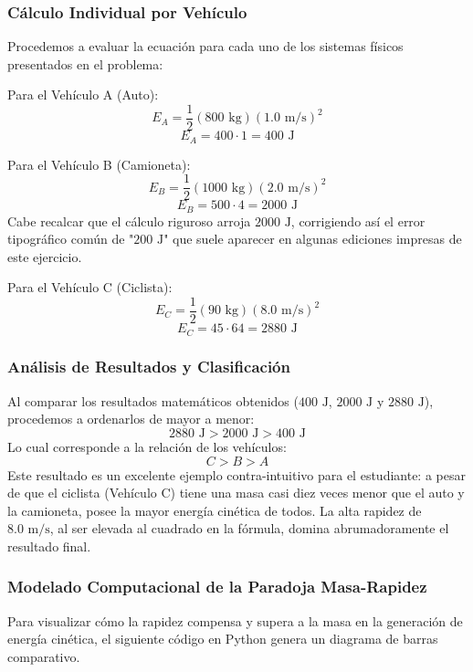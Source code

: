 \documentclass[a4paper,12pt]{article}
\begin{document}
\subsubsection*{Cálculo Individual por Vehículo}
Procedemos a evaluar la ecuación para cada uno de los sistemas físicos presentados en el problema:

Para el Vehículo A (Auto):
$$E_A = \frac{1}{2} (800\text{ kg}) (1.0\text{ m/s})^2$$
$$E_A = 400 \cdot 1 = 400\text{ J}$$

Para el Vehículo B (Camioneta):
$$E_B = \frac{1}{2} (1000\text{ kg}) (2.0\text{ m/s})^2$$
$$E_B = 500 \cdot 4 = 2000\text{ J}$$
Cabe recalcar que el cálculo riguroso arroja $2000\text{ J}$, corrigiendo así el error tipográfico común de "$200\text{ J}$" que suele aparecer en algunas ediciones impresas de este ejercicio.

Para el Vehículo C (Ciclista):
$$E_C = \frac{1}{2} (90\text{ kg}) (8.0\text{ m/s})^2$$
$$E_C = 45 \cdot 64 = 2880\text{ J}$$

\subsubsection*{Análisis de Resultados y Clasificación}
Al comparar los resultados matemáticos obtenidos ($400\text{ J}$, $2000\text{ J}$ y $2880\text{ J}$), procedemos a ordenarlos de mayor a menor:
$$2880\text{ J} > 2000\text{ J} > 400\text{ J}$$
Lo cual corresponde a la relación de los vehículos:
$$C > B > A$$
Este resultado es un excelente ejemplo contra-intuitivo para el estudiante: a pesar de que el ciclista (Vehículo C) tiene una masa casi diez veces menor que el auto y la camioneta, posee la mayor energía cinética de todos. La alta rapidez de $8.0\text{ m/s}$, al ser elevada al cuadrado en la fórmula, domina abrumadoramente el resultado final.

\subsubsection*{Modelado Computacional de la Paradoja Masa-Rapidez}
Para visualizar cómo la rapidez compensa y supera a la masa en la generación de energía cinética, el siguiente código en Python genera un diagrama de barras comparativo.
\end{document}
